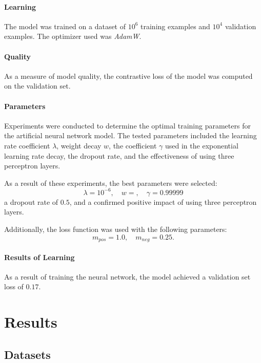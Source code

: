 \documentclass[pdflatex,sn-vancouver-num]{sn-jnl}%
\begin{document}
                \paragraph{Learning}
                The model was trained on a dataset of $10^{6}$ training examples and $10^{4}$ validation examples. The optimizer used was \textit{AdamW}\cite{Loshchilov2017DecoupledWD}.

                \paragraph{Quality}
                As a measure of model quality, the contrastive loss of the model was computed on the validation set.

                \paragraph{Parameters}
                Experiments were conducted to determine the optimal training parameters for the artificial neural network model. The tested parameters included the learning rate coefficient \( \lambda \), weight decay \( w \), the coefficient \( \gamma \) used in the exponential learning rate decay, the dropout rate, and the effectiveness of using three perceptron layers.

                As a result of these experiments, the best parameters were selected:
                \[
                \lambda = 10^{-6}, \quad w = , \quad \gamma = 0.99999
                \]
                a dropout rate of \( 0.5 \), and a confirmed positive impact of using three perceptron layers.

                Additionally, the loss function was used with the following parameters:
                \[
                m_{pos} = 1.0, \quad m_{neg} = 0.25.
                \]


                \paragraph{Results of Learning}
                As a result of training the neural network, the model achieved a validation set loss of $0.17$.

    \section{Results}

        \subsection{Datasets}
\end{document}
